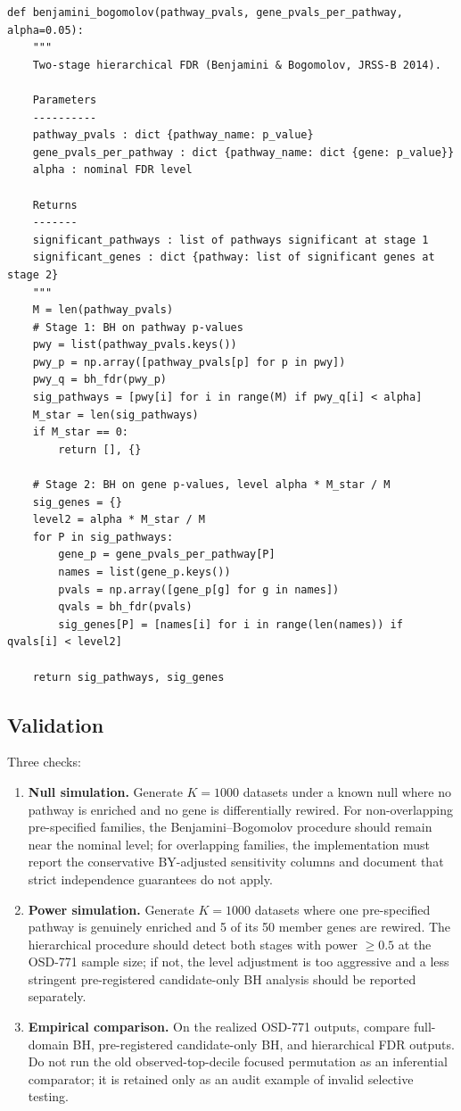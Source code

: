 \documentclass[11pt]{article}
\begin{document}
\begin{lstlisting}[style=pythonstyle,caption={Hierarchical Benjamini--Bogomolov implementation.}]
def benjamini_bogomolov(pathway_pvals, gene_pvals_per_pathway, alpha=0.05):
    """
    Two-stage hierarchical FDR (Benjamini & Bogomolov, JRSS-B 2014).

    Parameters
    ----------
    pathway_pvals : dict {pathway_name: p_value}
    gene_pvals_per_pathway : dict {pathway_name: dict {gene: p_value}}
    alpha : nominal FDR level

    Returns
    -------
    significant_pathways : list of pathways significant at stage 1
    significant_genes : dict {pathway: list of significant genes at stage 2}
    """
    M = len(pathway_pvals)
    # Stage 1: BH on pathway p-values
    pwy = list(pathway_pvals.keys())
    pwy_p = np.array([pathway_pvals[p] for p in pwy])
    pwy_q = bh_fdr(pwy_p)
    sig_pathways = [pwy[i] for i in range(M) if pwy_q[i] < alpha]
    M_star = len(sig_pathways)
    if M_star == 0:
        return [], {}

    # Stage 2: BH on gene p-values, level alpha * M_star / M
    sig_genes = {}
    level2 = alpha * M_star / M
    for P in sig_pathways:
        gene_p = gene_pvals_per_pathway[P]
        names = list(gene_p.keys())
        pvals = np.array([gene_p[g] for g in names])
        qvals = bh_fdr(pvals)
        sig_genes[P] = [names[i] for i in range(len(names)) if qvals[i] < level2]

    return sig_pathways, sig_genes
\end{lstlisting}

\subsection{Validation}

Three checks:

\begin{enumerate}[leftmargin=*]
\item \textbf{Null simulation.} Generate $K=1000$ datasets under a known null where no pathway is enriched and no gene is differentially rewired. For non-overlapping pre-specified families, the Benjamini--Bogomolov procedure should remain near the nominal level; for overlapping families, the implementation must report the conservative BY-adjusted sensitivity columns and document that strict independence guarantees do not apply.
\item \textbf{Power simulation.} Generate $K=1000$ datasets where one pre-specified pathway is genuinely enriched and 5 of its 50 member genes are rewired. The hierarchical procedure should detect both stages with power $\geq 0.5$ at the OSD-771 sample size; if not, the level adjustment is too aggressive and a less stringent pre-registered candidate-only BH analysis should be reported separately.
\item \textbf{Empirical comparison.} On the realized OSD-771 outputs, compare full-domain BH, pre-registered candidate-only BH, and hierarchical FDR outputs. Do not run the old observed-top-decile focused permutation as an inferential comparator; it is retained only as an audit example of invalid selective testing.
\end{enumerate}
\end{document}
